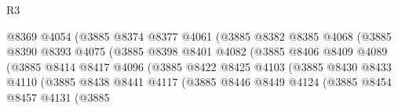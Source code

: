 \begin{lexlean}{R3}
\begin{coremodule}
                                      @8369
                                      @4054
                                      (@3885
                                        @8374
                                        @8377
                                        @4061
                                        (@3885
                                          @8382
                                          @8385
                                          @4068
                                          (@3885
                                            @8390
                                            @8393
                                            @4075
                                            (@3885
                                              @8398
                                              @8401
                                              @4082
                                              (@3885
                                                @8406
                                                @8409
                                                @4089
                                                (@3885
                                                  @8414
                                                  @8417
                                                  @4096
                                                  (@3885
                                                    @8422
                                                    @8425
                                                    @4103
                                                    (@3885
                                                      @8430
                                                      @8433
                                                      @4110
                                                      (@3885
                                                        @8438
                                                        @8441
                                                        @4117
                                                        (@3885
                                                          @8446
                                                          @8449
                                                          @4124
                                                          (@3885
                                                            @8454
                                                            @8457
                                                            @4131
                                                            (@3885

\end{coremodule}
\end{lexlean}
